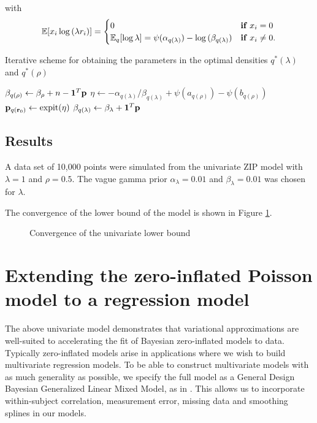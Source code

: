 \documentclass{article}[12pt]
\begin{document}
\noindent with 
$$
{\mathbb E} [x_i \log{(\lambda r_i)}]  =
	\begin{cases}
	0 & \textbf{if } x_i = 0 \\
	{\mathbb E}_q [\log \lambda] = \psi(\alpha_{q(\lambda)}) - \log{(\beta_{q(\lambda)})} & \textbf{if } x_i \ne 0. \\
	\end{cases}
$$

\begin{algorithm} 
\caption[Algorithm 1]{Iterative scheme for obtaining the parameters in the
optimal densities $q^*(\lambda)$ and $q^*(\rho)$}
\begin{algorithmic}
\STATE $\beta_{q(\rho)} \leftarrow \beta_\rho + n - {\bf 1}^T{\bf p}$
\STATE $\eta \leftarrow -\alpha_{q(\lambda)}/\beta_{q(\lambda)} + \psi{(a_{q{(\rho)}})} - \psi{(b_{q{(\rho)}})}$
\STATE ${\bf p}_{q({\bf r}_0)} \leftarrow \text{expit} (\eta)$
\STATE $\beta_{q(\lambda)} \leftarrow \beta_\lambda + {\bf 1}^T{\bf p}$
\ENDWHILE
\end{algorithmic}
\label{algorithm1}
\end{algorithm}


\subsection{Results}
A data set of 10,000 points were simulated from the univariate ZIP model with
$\lambda = 1$ and $\rho = 0.5$. The vague gamma prior $\alpha_\lambda = 0.01$ and $\beta_\lambda = 0.01$ was chosen for $\lambda$.

The convergence of the lower bound of the model is shown in Figure 
\ref{fig:univariate_lower_bound}.

\begin{figure}
\caption{Convergence of the univariate lower bound}
\label{fig:univariate_lower_bound}
\end{figure}



\section{Extending the zero-inflated Poisson model to a regression model}
\noindent The above univariate model demonstrates that variational approximations are well-suited
to accelerating the fit of Bayesian zero-inflated models to data. Typically zero-inflated
models arise in applications where we wish to build multivariate regression models. To be able to
construct multivariate models with as much generality as possible, we specify the full
model as a General Design Bayesian Generalized Linear Mixed Model, as in \citep{zhao06}.
This allows us to incorporate within-subject correlation, measurement error, missing data
and smoothing splines in our models.
\end{document}
